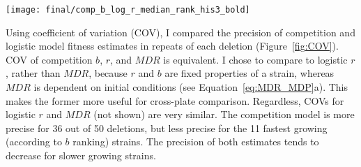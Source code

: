 \graphicspath{{images/COV/}}
\begin{Figure}
  \centering
  \texttt{[image: final/comp\_b\_log\_r\_median\_rank\_his3\_bold]}
  \label{fig:COV}
\end{Figure}
\begin{multicols}{2}


Using coefficient of variation (COV), I compared the precision of
competition and logistic model fitness estimates in repeats of each
deletion (Figure~\ref{fig:COV}). COV of competition \(b\), \(r\), and
\(MDR\) is equivalent. I chose to compare to logistic \(r\), rather
than \(MDR\), because \(r\) and \(b\) are fixed properties of a
strain, whereas \(MDR\) is dependent on initial conditions (see
Equation~\ref{eq:MDR_MDP}a). This makes the former more useful for
cross-plate comparison. Regardless, COVs for logistic \(r\) and
\(MDR\) (not shown) are very similar.
The competition model is more precise for 36 out of 50 deletions, but
less precise for the 11 fastest growing (according to \(b\) ranking)
strains. The precision of both estimates tends to decrease for slower
growing strains.





\end{multicols}
